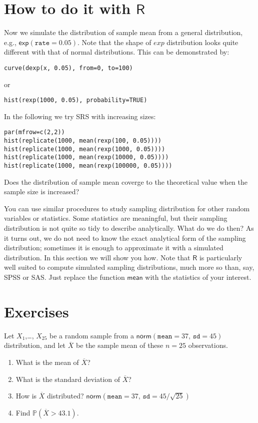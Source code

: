 \section{How to do it with $\mathsf{R}$}
\label{sec-8-5}

Now we simulate the distribution of sample mean from a general distribution, e.g., $\mathsf{exp}(\mathtt{rate}=0.05)$.
Note that the shape of $exp$ distribution looks quite different with that of normal distributions.
This can be demonstrated by:
\begin{Verbatim}
curve(dexp(x, 0.05), from=0, to=100)
\end{Verbatim}
or
\begin{Verbatim}
hist(rexp(1000, 0.05), probability=TRUE)
\end{Verbatim}

In the following we try SRS with increasing sizes:
\begin{Verbatim}
par(mfrow=c(2,2))
hist(replicate(1000, mean(rexp(100, 0.05))))
hist(replicate(1000, mean(rexp(1000, 0.05))))
hist(replicate(1000, mean(rexp(10000, 0.05))))
hist(replicate(1000, mean(rexp(100000, 0.05))))
\end{Verbatim}
Does the distribution of sample mean coverge to the theoretical value when the sample size is increased?

You can use similar procedures to study sampling distribution for other random variables or statistics.
Some statistics are meaningful, but their sampling distribution is
not quite so tidy to describe analytically. What do we do then?
As it turns out, we do not need to know the exact analytical form of
the sampling distribution; sometimes it is enough to approximate it
with a simulated distribution. In this section we will show you
how. Note that \(\mathsf{R}\) is particularly well suited to compute
simulated sampling distributions, much more so than, say, SPSS or SAS.
Just replace the function $\mathsf{mean}$ with the statistics of your interest.

\newpage{}

\section{Exercises}
\label{sec-8-6}
\setcounter{thm}{0}

\begin{xca}
Let \(X_{1}\),\ldots{}, \(X_{25}\) be a random sample from a
\(\mathsf{norm}(\mathtt{mean}=37,\,\mathtt{sd}=45)\) distribution, and
let \(\overline{X}\) be the sample mean of these \(n=25\)
observations.
\begin{enumerate}
\item What is the mean of \(\overline{X}\)?
\item What is the standard deviation of \(\overline{X}\)?
\item How is \(\overline{X}\) distributed? 
\(\mathsf{norm}(\mathtt{mean}=37,\,\mathtt{sd}=45/\sqrt{25})\)
\item Find \(\mathbb{P}(\overline{X} > 43.1)\).
\end{enumerate}
\end{xca}
